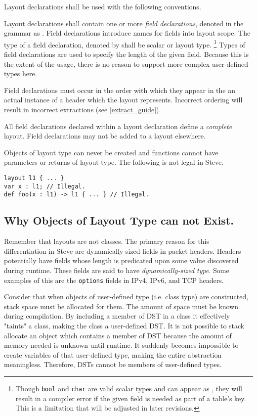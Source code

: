 Layout declarations shall be used with the following conventions.

Layout declarations shall contain one or more \textit{field declarations}, denoted in the grammar as . Field declarations introduce names for fields into layout scope. The type of a field declaration, denoted by  shall be scalar or layout type. \footnote{Though \texttt{bool} and \texttt{char} are valid scalar types and can appear as , they will result in a compiler error if the given field is needed as part of a table's key. This is a limitation that will be adjusted in later revisions.} Types of field declarations are used to specify the length of the given field. Because this is the extent of the usage, there is no reason to support more complex user-defined types here. 

Field declarations must occur in the order with which they appear in the an actual instance of a header which the layout represents. Incorrect ordering will result in incorrect extractions (see \ref{extract_guide}).

All field declarations declared within a layout declaration define a \textit{complete} layout. Field declarations may not be added to a layout elsewhere.

Objects of layout type can never be created and functions cannot have parameters or returns of layout type. The following is not legal in Steve.

\noindent\begin{minipage}{\linewidth}
\begin{lstlisting}
layout l1 { ... }
var x : l1; // Illegal.
def foo(x : l1) -> l1 { ... } // Illegal.
\end{lstlisting}
\end{minipage}

\subsection{Why Objects of Layout Type can not Exist.}

Remember that layouts are not classes. The primary reason for this differentiation in Steve are dynamically-sized fields in packet headers. Headers potentially have fields whose length is predicated upon some value discovered during runtime. These fields are said to have \textit{dynamically-sized type}. Some examples of this are the \texttt{options} fields in IPv4, IPv6, and TCP headers. 

Consider that when objects of user-defined type (i.e. class type) are constructed, stack space must be allocated for them. The amount of space must be known during compilation. By including a member of DST in a class it effectively "taints" a class, making the class a user-defined DST. It is not possible to stack allocate an object which contains a member of DST because the amount of memory needed is unknown until runtime. It suddenly becomes impossible to create variables of that user-defined type, making the entire abstraction meaningless. Therefore, DSTs cannot be members of user-defined types. 

